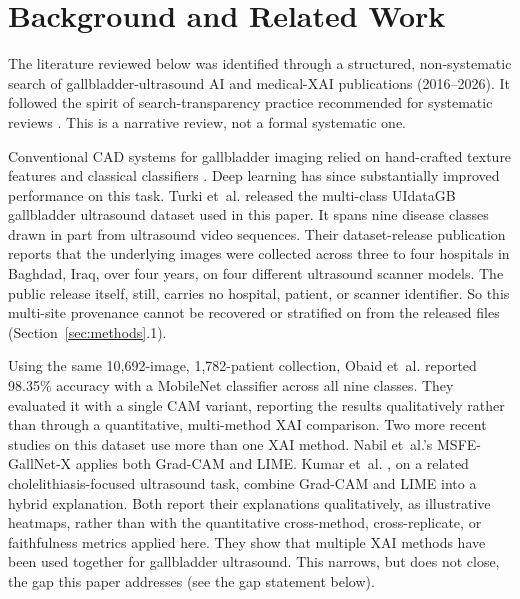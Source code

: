 \section{Background and Related Work}
\label{sec:related-work}

The literature reviewed below was identified through a structured, non-systematic search of gallbladder-ultrasound AI and medical-XAI publications (2016--2026). It followed the spirit of search-transparency practice recommended for systematic reviews \cite{ref15}. This is a narrative review, not a formal systematic one.

Conventional CAD systems for gallbladder imaging relied on hand-crafted texture features and classical classifiers \cite{ref16}. Deep learning has since substantially improved performance on this task. Turki et~al. \cite{ref17} released the multi-class UIdataGB gallbladder ultrasound dataset used in this paper. It spans nine disease classes drawn in part from ultrasound video sequences. Their dataset-release publication reports that the underlying images were collected across three to four hospitals in Baghdad, Iraq, over four years, on four different ultrasound scanner models. The public release itself, still, carries no hospital, patient, or scanner identifier. So this multi-site provenance cannot be recovered or stratified on from the released files (Section~\ref{sec:methods}.1).

Using the same 10,692-image, 1,782-patient collection, Obaid et~al. \cite{ref18} reported 98.35\% accuracy with a MobileNet classifier across all nine classes. They evaluated it with a single CAM variant, reporting the results qualitatively rather than through a quantitative, multi-method XAI comparison. Two more recent studies on this dataset use more than one XAI method. Nabil et~al.'s MSFE-GallNet-X \cite{ref57} applies both Grad-CAM and LIME. Kumar et~al. \cite{ref58}, on a related cholelithiasis-focused ultrasound task, combine Grad-CAM and LIME into a hybrid explanation. Both report their explanations qualitatively, as illustrative heatmaps, rather than with the quantitative cross-method, cross-replicate, or faithfulness metrics applied here. They show that multiple XAI methods have been used together for gallbladder ultrasound. This narrows, but does not close, the gap this paper addresses (see the gap statement below).


